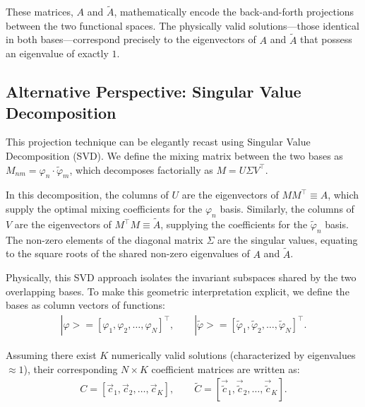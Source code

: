 These matrices, \(A\) and \(\tilde{A}\), mathematically encode the back-and-forth projections between the two functional spaces. The physically valid solutions—those identical in both bases—correspond precisely to the eigenvectors of \(A\) and \(\tilde{A}\) that possess an eigenvalue of exactly $1$.


\subsection{Alternative Perspective: Singular Value Decomposition}\label{subsec:svd}

This projection technique can be elegantly recast using Singular Value Decomposition (SVD). We define the mixing matrix between the two bases as \(M_{nm} = \varphi_n \cdot \tilde{\varphi}_m\), which decomposes factorially as \(M = U \Sigma V^\top\).

In this decomposition, the columns of \(U\) are the eigenvectors of \(MM^\top \equiv A\), which supply the optimal mixing coefficients for the \(\varphi_n\) basis. Similarly, the columns of \(V\) are the eigenvectors of \(M^\top M \equiv \tilde{A}\), supplying the coefficients for the \(\tilde{\varphi}_n\) basis. The non-zero elements of the diagonal matrix \(\Sigma\) are the singular values, equating to the square roots of the shared non-zero eigenvalues of \(A\) and \(\tilde{A}\).

Physically, this SVD approach isolates the invariant subspaces shared by the two overlapping bases. To make this geometric interpretation explicit, we define the bases as column vectors of functions:
\begin{equation}
\begin{aligned}
    |\varphi\big> = [\varphi_1, \varphi_2, \ldots, \varphi_N]^\top, \qquad |\tilde{\varphi}\big> = [\tilde{\varphi}_1, \tilde{\varphi}_2, \ldots, \tilde{\varphi}_N]^\top.
\end{aligned}
\end{equation}

Assuming there exist \(K\) numerically valid solutions (characterized by eigenvalues $\approx 1$), their corresponding \(N \times K\) coefficient matrices are written as:
\begin{equation}
\begin{aligned}
    C = [\vec{c}_1, \vec{c}_2, \dots, \vec{c}_K], \qquad \tilde{C} = [\vec{\tilde{c}}_1, \vec{\tilde{c}}_2, \dots, \vec{\tilde{c}}_K].
\end{aligned}
\end{equation}


